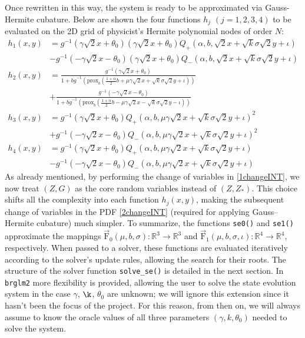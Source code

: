 \documentclass{article}
\begin{document}
Once rewritten in this way, the system is ready to be approximated via Gauss-Hermite cubature. Below are shown the four functions $h_j$ $(j=1,2,3,4)$ to be evaluated on the 2D grid of physicist’s Hermite polynomial nodes of order $N$:
\begin{align*}
h_1(x,y)&=g^{-1}(\gamma \sqrt{2}x+\theta_0)(\gamma \sqrt{2}x+\theta_0)Q_{+}(\alpha,b,\sqrt{2}x+\sqrt{k}\sigma \sqrt{2}y+\iota)\\[5pt]
&-g^{-1}(-\gamma \sqrt{2}x-\theta_0)(\gamma \sqrt{2}x+\theta_0)Q_{-}(\alpha,b,\sqrt{2}x+\sqrt{k}\sigma \sqrt{2}y+\iota)\\[10pt]
h_2(x,y)&=\frac{g^{-1}(\gamma \sqrt{2}x+\theta_0)}{1+b\dot{g}^{-1}(\text{prox}_b(\frac{1+\alpha}{2}b+\mu \gamma \sqrt{2}x+\sqrt{k}\sigma \sqrt{2}y+\iota))}\\[5pt]
&+\frac{g^{-1}(-\gamma \sqrt{2}x-\theta_0)}{1+b\dot{g}^{-1}(\text{prox}_b(\frac{1+\alpha}{2}b-\mu \gamma \sqrt{2}x-\sqrt{k}\sigma \sqrt{2}y-\iota))}\\[10pt]
h_3(x,y)&=g^{-1}(\gamma \sqrt{2}x+\theta_0)Q_{+}(\alpha,b,\mu \gamma \sqrt{2}x+\sqrt{k}\sigma \sqrt{2}y+\iota)^2\\[5pt]
&+g^{-1}(-\gamma \sqrt{2}x-\theta_0)Q_{-}(\alpha,b,\mu \gamma \sqrt{2}x+\sqrt{k}\sigma \sqrt{2}y+\iota)^2\\[10pt]
h_4(x,y)&=g^{-1}(\gamma \sqrt{2}x+\theta_0)Q_{+}(\alpha,b,\mu \gamma \sqrt{2}x+\sqrt{k}\sigma \sqrt{2}y+\iota)\\
&-g^{-1}(-\gamma \sqrt{2}x-\theta_0)Q_{-}(\alpha,b,\mu \gamma \sqrt{2}x+\sqrt{k}\sigma \sqrt{2}y+\iota)
\end{align*}
As already mentioned, by performing the change of variables in \eqref{1changeINT}, we now treat $(Z, G)$ as the core random variables instead of $(Z, Z_*)$. This choice shifts all the complexity into each function $h_j(x,y)$, making the subsequent change of variables in the PDF \eqref{2changeINT} (required for applying Gauss–Hermite cubature) much simpler. To summarize, the functions \texttt{se0()} and \texttt{se1()} approximate the mappings $\vec{\text{F}}_0(\mu,b,\sigma): \mathbb{R}^3 \to \mathbb{R}^3$ and $\vec{\text{F}}_1(\mu,b,\sigma,\iota): \mathbb{R}^4 \to \mathbb{R}^4$, respectively. When passed to a solver, these functions are evaluated iteratively according to the solver’s update rules, allowing the search for their roots. The structure of the solver function \texttt{solve\_se()} is detailed in the next section. In \texttt{brglm2} more flexibility is provided, allowing the user to solve the state evolution system in the case $\gamma$, $\k$, $\theta_0$ are unknown; we will ignore this extension since it hasn't been the focus of the project. For this reason, from then on, we will always assume to know the oracle values of all three parameters $(\gamma, k,\theta_0)$ needed to solve the system. 
\end{document}
